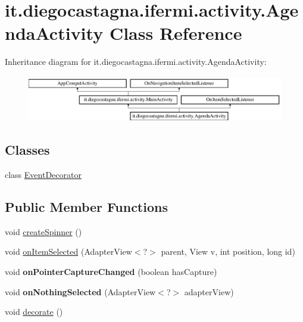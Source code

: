 \hypertarget{classit_1_1diegocastagna_1_1ifermi_1_1activity_1_1_agenda_activity}{}\section{it.\+diegocastagna.\+ifermi.\+activity.\+Agenda\+Activity Class Reference}
\label{classit_1_1diegocastagna_1_1ifermi_1_1activity_1_1_agenda_activity}
Inheritance diagram for it.\+diegocastagna.\+ifermi.\+activity.\+Agenda\+Activity\+:\begin{figure}[H]
\begin{center}
\leavevmode
\includegraphics[height=1.992882cm]{classit_1_1diegocastagna_1_1ifermi_1_1activity_1_1_agenda_activity}
\end{center}
\end{figure}
\subsection*{Classes}
\begin{DoxyCompactItemize}
\item 
class \mbox{\hyperlink{classit_1_1diegocastagna_1_1ifermi_1_1activity_1_1_agenda_activity_1_1_event_decorator}{Event\+Decorator}}
\end{DoxyCompactItemize}
\subsection*{Public Member Functions}
\begin{DoxyCompactItemize}
\item 
void \mbox{\hyperlink{classit_1_1diegocastagna_1_1ifermi_1_1activity_1_1_agenda_activity_a2f0c4b0175930529c241d38a4172ae36}{create\+Spinner}} ()
\item 
void \mbox{\hyperlink{classit_1_1diegocastagna_1_1ifermi_1_1activity_1_1_agenda_activity_a9236dd89796b6b613091b69a75f606e6}{on\+Item\+Selected}} (Adapter\+View$<$?$>$ parent, View v, int position, long id)
\item 
\mbox{\label{classit_1_1diegocastagna_1_1ifermi_1_1activity_1_1_agenda_activity_a51ec0c7927ffe54f9e9b2f2bb3063566}} 
void {\bfseries on\+Pointer\+Capture\+Changed} (boolean has\+Capture)
\item 
\mbox{\label{classit_1_1diegocastagna_1_1ifermi_1_1activity_1_1_agenda_activity_a1a30637bac278c780adec158e00bdcae}} 
void {\bfseries on\+Nothing\+Selected} (Adapter\+View$<$?$>$ adapter\+View)
\item 
void \mbox{\hyperlink{classit_1_1diegocastagna_1_1ifermi_1_1activity_1_1_agenda_activity_a68a47edf7dd34ed0220f452651d69731}{decorate}} ()
\end{DoxyCompactItemize}

